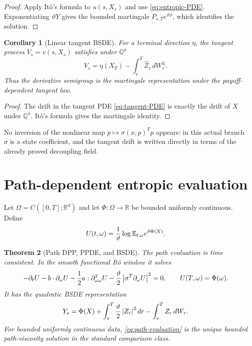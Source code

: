\documentclass[11pt,reqno]{amsart}
\newtheorem{theorem}{Theorem}[section]
\newtheorem{corollary}[theorem]{Corollary}
\theoremstyle{definition}
\theoremstyle{remark}
\newcommand{\E}{\mathbb E}
\newcommand{\Qp}{\mathbb Q}
\newcommand{\R}{\mathbb R}
\newcommand{\abs}[1]{\left\lvert #1\right\rvert}
\begin{document}
\begin{proof}
Apply It\^o's formula to $u(s,X_s)$ and use
\eqref{eq:entropic-PDE}.  Exponentiating $\vartheta Y$ gives the bounded
martingale $P_{s,T}e^{\vartheta\phi}$, which identifies the solution.
\end{proof}

\begin{corollary}[Linear tangent BSDE]\label{cor:tangent-BSDE}
For a terminal direction $\eta$, the tangent process
$V_s=v(s,X_s)$ satisfies under $\Qp^\phi$
\begin{equation}\label{eq:tangent-BSDE}
 V_s=\eta(X_T)-\int_s^T\widehat Z_r\,dW_r^{\Qp}.
\end{equation}
Thus the derivative semigroup is the martingale representation under the
payoff-dependent tangent law.
\end{corollary}

\begin{proof}
The drift in the tangent PDE \eqref{eq:tangent-PDE} is exactly the drift of
$X$ under $\Qp^\phi$.  It\^o's formula gives the martingale identity.
\end{proof}

No inversion of the nonlinear map $p\mapsto\sigma(x,p)^Tp$ appears: in this
actual branch $\sigma$ is a state coefficient, and the tangent drift is written
directly in terms of the already proved decoupling field.

\section{Path-dependent entropic evaluation}

Let $\Omega=C([0,T];\R^d)$ and let $\Phi:\Omega\to\R$ be bounded uniformly
continuous.  Define
\begin{equation}\label{eq:path-evaluation}
 U(t,\omega)={1\over\vartheta}
 \log\E_{t,\omega}e^{\vartheta\Phi(X)}.
\end{equation}

\begin{theorem}[Path DPP, PPDE, and BSDE]\label{thm:path}
The path evaluation is time consistent.  In the smooth functional It\^o
window it solves
\begin{equation}\label{eq:PPDE}
 -\partial_tU-b\cdot\partial_\omega U
 -{1\over2}a:\partial_{\omega\omega}^2U
 -{\vartheta\over2}
 \abs{\sigma^T\partial_\omega U}^2=0,
 \qquad U(T,\omega)=\Phi(\omega).
\end{equation}
It has the quadratic BSDE representation
\[
 Y_s=\Phi(X)+\int_s^T{\vartheta\over2}\abs{Z_r}^2dr
 -\int_s^TZ_r\,dW_r.
\]
For bounded uniformly continuous data, \eqref{eq:path-evaluation} is the unique
bounded path-viscosity solution in the standard comparison class.
\end{theorem}
\end{document}
